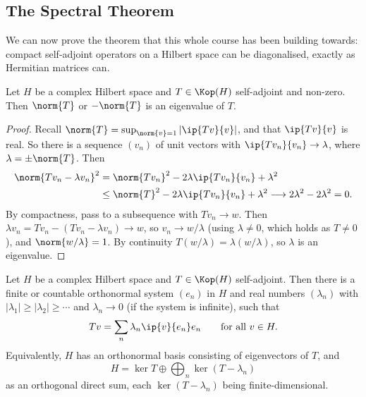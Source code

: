\subsection{The Spectral Theorem}

We can now prove the theorem that this whole course has been building towards: compact self-adjoint operators on a Hilbert space can be diagonalised, exactly as Hermitian matrices can.

\begin{lemma}
	Let $H$ be a complex Hilbert space and $T\in\Kop(H)$ self-adjoint and non-zero. Then $\norm{T}$ or $-\norm{T}$ is an eigenvalue of $T$.
\end{lemma}

\begin{proof}
	Recall $\norm{T} = \sup_{\norm{v}=1}|\ip{Tv}{v}|$, and that $\ip{Tv}{v}$ is real. So there is a sequence $(v_n)$ of unit vectors with $\ip{Tv_n}{v_n}\to\lambda$, where $\lambda = \pm\norm{T}$. Then
	\begin{align*}
		\norm{Tv_n - \lambda v_n}^2 &= \norm{Tv_n}^2 - 2\lambda\ip{Tv_n}{v_n}+\lambda^2 \\
		&\leq \norm{T}^2 - 2\lambda\ip{Tv_n}{v_n}+\lambda^2 \longrightarrow 2\lambda^2 - 2\lambda^2 = 0.
	\end{align*}
	By compactness, pass to a subsequence with $Tv_n \to w$. Then $\lambda v_n = Tv_n - (Tv_n - \lambda v_n)\to w$, so $v_n \to w/\lambda$ (using $\lambda\neq0$, which holds as $T \neq 0$), and $\norm{w/\lambda}=1$. By continuity $T(w/\lambda) = \lambda (w/\lambda)$, so $\lambda$ is an eigenvalue.
\end{proof}

\begin{theorem}
	Let $H$ be a complex Hilbert space and $T \in\Kop(H)$ self-adjoint. Then there is a finite or countable orthonormal system $(e_n)$ in $H$ and real numbers $(\lambda_n)$ with $|\lambda_1|\geq|\lambda_2|\geq\cdots$ and $\lambda_n\to0$ (if the system is infinite), such that
	$$Tv = \sum_n \lambda_n \ip{v}{e_n}e_n \qquad \text{for all } v \in H.$$
	Equivalently, $H$ has an orthonormal basis consisting of eigenvectors of $T$, and
	$$H = \ker T \oplus \bigoplus_n \ker(T-\lambda_n)$$
	as an orthogonal direct sum, each $\ker(T-\lambda_n)$ being finite-dimensional.
\end{theorem}

